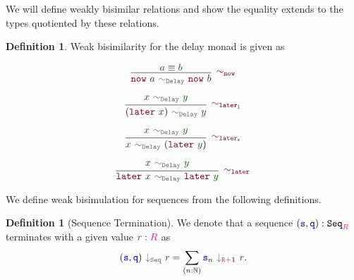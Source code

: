 \documentclass[twoside,11pt,openright]{report}
\theoremstyle{plain} %
\theoremstyle{definition}
\newtheorem{defn}[thm]{Definition}%
\theoremstyle{remark}
\newcommand*{\term}[1]{\textcolor{green!30!black}{#1}} %
\newcommand*{\type}[1]{\textcolor{magenta!90!black}{#1}}
\newcommand*{\unit}{\type{\textbf{1}}}
\newcommand*{\relation}[1]{\textcolor{gray!75!black}{\ensuremath{\mathtt{#1}}}}
\newcommand*{\function}[1]{\textcolor{blue!60!black}{\ensuremath{\mathtt{#1}}}}
\newcommand*{\constructor}[1]{\textcolor{purple!60!black}{\ensuremath{\mathtt{#1}}}}
\newcommand*{\typeformer}[1]{\ensuremath{\mathtt{#1}}}
\begin{document}
\noindent We will define weakly bisimilar relations and show the equality extends to the types quotiented by these relations.
\begin{defn}
  \label{defn:weak-bisim-delay-monad}
  Weak bisimilarity for the delay monad is given as
  \begin{center}
    \strut
    \hfill
    \begin{minipage}[h]{0.375\linewidth}
      \begin{equation}
        \vcenter{\infer[\constructor{\sim_{now}}]{\constructor{now}~\term{a}~\relation{\sim_{Delay}}~\constructor{now}~\term{b}}{\term{a} \equiv \term{b}}}
      \end{equation}
    \end{minipage}
    \hfill
    \begin{minipage}[h]{0.375\linewidth}
      \begin{equation}
        \vcenter{\infer[\constructor{\sim_{later_l}}]{(\constructor{later}~\term{x})~\relation{\sim_{Delay}}~\term{y}}{\term{x}~\relation{\sim_{Delay}}~\term{y}}}
      \end{equation}
    \end{minipage}
    \hfill
    \strut
  \end{center}
  \begin{center}
    \strut
    \hfill
    \begin{minipage}[h]{0.375\linewidth}
      \begin{equation}
        \vcenter{\infer[\constructor{\sim_{later_r}}]{\term{x}~\relation{\sim_{Delay}}~(\constructor{later}~\term{y})}{\term{x}~\relation{\sim_{Delay}}~\term{y}}}
      \end{equation}
    \end{minipage}
    \hfill
    \begin{minipage}[h]{0.425\linewidth}
      \begin{equation}
        \vcenter{\infer[\constructor{\sim_{later}}]{\constructor{later}~\term{x}~\relation{\sim_{Delay}}~\constructor{later}~\term{y}}{\term{x}~\relation{\sim_{Delay}}~\term{y}}}
      \end{equation}
    \end{minipage}
    \hfill
    \strut
  \end{center}
\end{defn}
\noindent We define weak bisimulation for sequences from the following definitions.
\begin{defn}[Sequence Termination]
  We denote that a sequence \((\function{s},\function{q}) : \typeformer{Seq}_{\type{R}}\) terminates with a given value \(\term{r} : \type{R}\) as
  \begin{equation}
    (\function{s},\function{q})~\relation{\downarrow_{Seq}}~\term{r} = \sum_{(n : \mathbb{N})} \function{s}_n~\relation{\downarrow_{\type{R} + \unit}}~\term{r}.
  \end{equation}
\end{defn}
\end{document}

